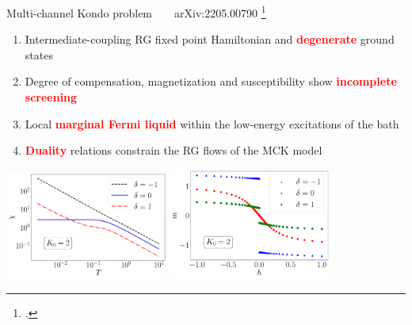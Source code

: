 \documentclass[10pt,aspectratio=169]{beamer}
\newcommand{\focus}[1]{\textcolor{red}{\bf{#1}}}
\begin{document}
\begin{frame}{Multi-channel Kondo problem ~ ~ arXiv:2205.00790}
\footcite{Noz_blandin_1980,Tsvelick_weigmann_mchannel_1985,affleck1993exact,Gan_mchannel_1994,affleck_1991_overscreen,emery_kivelson,bulla_1998}

\begin{enumerate}
	\item Intermediate-coupling RG fixed point Hamiltonian and \focus{degenerate} ground states
	\item Degree of compensation, magnetization and susceptibility show \focus{incomplete screening}
	\item Local \focus{marginal Fermi liquid} within the low-energy excitations of the bath
	\item \focus{Duality} relations constrain the RG flows of the MCK model
\end{enumerate}
\vspace*{\fill}

\includegraphics[width=0.4\textwidth]{CentralFieldChiPowerlaw.pdf}
\hspace*{\fill}
\includegraphics[width=0.4\textwidth]{discmagimpgen.pdf}

\end{frame}
\end{document}
